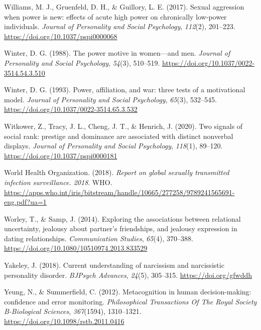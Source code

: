 \documentclass[
  donotrepeattitle,doc, 12pt, a4paper,floatsintext]{apa7}
\newlength{\cslhangindent}
\newlength{\cslentryspacingunit} %
\newenvironment{CSLReferences}[2] %
 {%
  \setlength{\parindent}{0pt}
  \ifodd #1
  \let\oldpar\par
  \def\par{\hangindent=\cslhangindent\oldpar}
  \fi
  \setlength{\parskip}{#2\cslentryspacingunit}
 }%
 {}
\begin{document}
\begin{CSLReferences}{1}{0}
\leavevmode{}%
Williams, M. J., Gruenfeld, D. H., \& Guillory, L. E. (2017). Sexual aggression when power is new: effects of acute high power on chronically low-power individuals. \emph{Journal of Personality and Social Psychology}, \emph{112}(2), 201--223. \url{https://doi.org/10.1037/pspi0000068}

\leavevmode{}%
Winter, D. G. (1988). The power motive in women---and men. \emph{Journal of Personality and Social Psychology}, \emph{54}(3), 510--519. \url{https://doi.org/10.1037/0022-3514.54.3.510}

\leavevmode{}%
Winter, D. G. (1993). Power, affiliation, and war: three tests of a motivational model. \emph{Journal of Personality and Social Psychology}, \emph{65}(3), 532--545. \url{https://doi.org/10.1037/0022-3514.65.3.532}

\leavevmode{}%
Witkower, Z., Tracy, J. L., Cheng, J. T., \& Henrich, J. (2020). Two signals of social rank: prestige and dominance are associated with distinct nonverbal displays. \emph{Journal of Personality and Social Psychology}, \emph{118}(1), 89--120. \url{https://doi.org/10.1037/pspi0000181}

\leavevmode{}%
World Health Organization. (2018). \emph{Report on global sexually transmitted infection surveillance. 2018}. WHO. \url{https://apps.who.int/iris/bitstream/handle/10665/277258/9789241565691-eng.pdf?ua=1}

\leavevmode{}%
Worley, T., \& Samp, J. (2014). Exploring the associations between relational uncertainty, jealousy about partner's friendships, and jealousy expression in dating relationships. \emph{Communication Studies}, \emph{65}(4), 370--388. \url{https://doi.org/10.1080/10510974.2013.833529}

\leavevmode{}%
Yakeley, J. (2018). Current understanding of narcissism and narcissistic personality disorder. \emph{BJPsych Advances}, \emph{24}(5), 305--315. \url{https://doi.org/gfwddh}

\leavevmode{}%
Yeung, N., \& Summerfield, C. (2012). Metacognition in human decision-making: confidence and error monitoring. \emph{Philosophical Transactions Of The Royal Society B-Biological Sciences}, \emph{367}(1594), 1310--1321. \url{https://doi.org/10.1098/rstb.2011.0416}


\end{CSLReferences}
\end{document}
